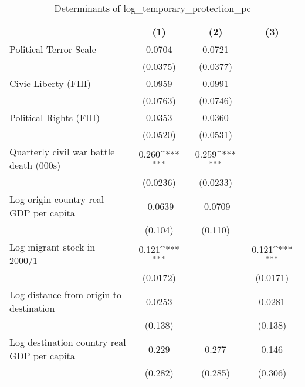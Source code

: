 \begin{table}[htbp]\centering
\def\sym#1{\ifmmode^{#1}\else\(^{#1}\)\fi}
\caption{Determinants of log\_temporary\_protection\_pc}
\begin{tabular}{l*{3}{c}}
\hline\hline
                    &\multicolumn{1}{c}{(1)}         &\multicolumn{1}{c}{(2)}         &\multicolumn{1}{c}{(3)}         \\
\hline
Political Terror Scale&      0.0704         &      0.0721         &                     \\
                    &    (0.0375)         &    (0.0377)         &                     \\
[1em]
Civic Liberty (FHI) &      0.0959         &      0.0991         &                     \\
                    &    (0.0763)         &    (0.0746)         &                     \\
[1em]
Political Rights (FHI)&      0.0353         &      0.0360         &                     \\
                    &    (0.0520)         &    (0.0531)         &                     \\
[1em]
Quarterly civil war battle death (000s)&       0.260\sym{***}&       0.259\sym{***}&                     \\
                    &    (0.0236)         &    (0.0233)         &                     \\
[1em]
Log origin country real GDP per capita&     -0.0639         &     -0.0709         &                     \\
                    &     (0.104)         &     (0.110)         &                     \\
[1em]
Log migrant stock in 2000/1&       0.121\sym{***}&                     &       0.121\sym{***}\\
                    &    (0.0172)         &                     &    (0.0171)         \\
[1em]
Log distance from origin to destination&      0.0253         &                     &      0.0281         \\
                    &     (0.138)         &                     &     (0.138)         \\
[1em]
Log destination country real GDP per capita&       0.229         &       0.277         &       0.146         \\
                    &     (0.282)         &     (0.285)         &     (0.306)         \\

\end{tabular}
\end{table}
